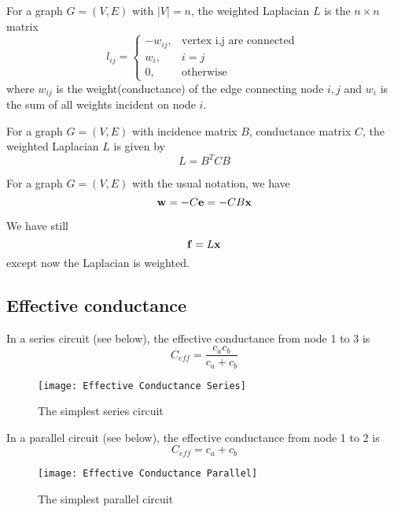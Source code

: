 \documentclass[11pt]{article}
\begin{document}
\begin{definition}
  For a graph \(G=(V,E)\) with \(|V|=n\), the weighted Laplacian \(L\) is the \(n\times n\) matrix
  \[l_{ij}=\begin{cases}
    -w_{ij},& \text{vertex i,j are connected } \\
    w_i,& i=j\\
    0,& \text{otherwise } 
  \end{cases}\]
  where \(w_{ij}\) is the weight(conductance) of the edge connecting node \(i,j\) and \(w_i\) is the sum of all weights incident on node \(i\).
\end{definition}

\begin{theorem}
  For a graph \(G=(V,E)\) with incidence matrix \(B\), conductance matrix \(C\), the weighted Laplacian \(L\) is given by
  \[L=B^TCB\]
\end{theorem}

\begin{theorem}
  For a graph \(G=(V,E)\) with the usual notation, we have
  \[\bf{w}=-C\bf{e}=-CB\bf{x}\]
\end{theorem}
We have still
\[\bf{f}=L\bf{x}\]
except now the Laplacian is weighted.

\subsection{Effective conductance}

\begin{definition}
  
\end{definition}

\begin{theorem}
  In a series circuit (see below), the effective conductance from node 1 to 3 is
  \[C_{eff}=\frac{c_ac_b}{c_a+c_b}\]
\end{theorem}
\begin{figure}[ht]
  \centering
  \texttt{[image: Effective Conductance Series]}
  \caption{The simplest series circuit}
\end{figure}

\begin{theorem}
  In a parallel circuit (see below), the effective conductance from node 1 to 2 is
  \[C_{eff}=c_a+c_b\]
\end{theorem}
\begin{figure}[ht]
  \centering
  \texttt{[image: Effective Conductance Parallel]}
  \caption{The simplest parallel circuit}
\end{figure}
\end{document}
